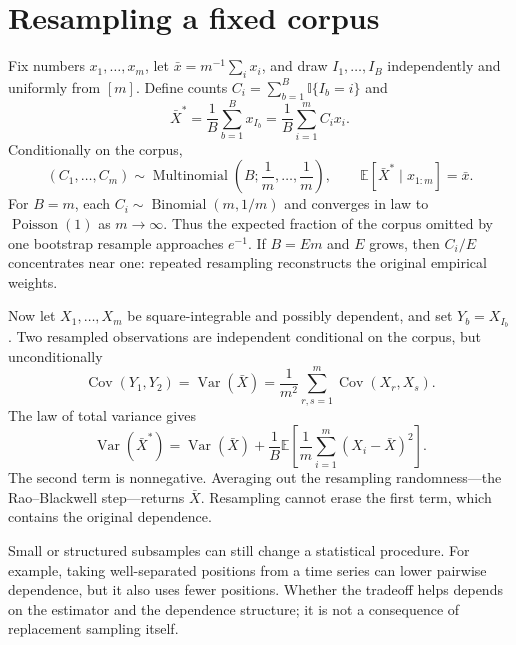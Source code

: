 \documentclass[11pt,twoside]{article}
\newcommand{\E}{\mathbb E}
\newcommand{\I}{\mathbb I}
\theoremstyle{definition}
\theoremstyle{remark}
\begin{document}
\exerciseinstructions
\setcounter{courseexercise}{0}








\appendix

\section{Resampling a fixed corpus}
\label{app:resampling}

Fix numbers \(x_1,\ldots,x_m\), let
\(\bar x=m^{-1}\sum_i x_i\), and draw \(I_1,\ldots,I_B\) independently and
uniformly from \([m]\). Define counts
\(C_i=\sum_{b=1}^B\I\{I_b=i\}\) and
\[
 \bar X^*=\frac1B\sum_{b=1}^B x_{I_b}
 =\frac1B\sum_{i=1}^m C_i x_i.
\]
Conditionally on the corpus,
\[
 (C_1,\ldots,C_m)\sim\operatorname{Multinomial}
 \left(B;\frac1m,\ldots,\frac1m\right),
 \qquad
 \E[\bar X^*\mid x_{1:m}]=\bar x.
\]
For \(B=m\), each \(C_i\sim\operatorname{Binomial}(m,1/m)\) and converges in
law to \(\operatorname{Poisson}(1)\) as \(m\to\infty\). Thus the expected
fraction of the corpus omitted by one bootstrap resample approaches
\(e^{-1}\). If
\(B=Em\) and \(E\) grows, then \(C_i/E\) concentrates near one: repeated
resampling reconstructs the original empirical weights.

Now let \(X_1,\ldots,X_m\) be square-integrable and possibly dependent, and set
\(Y_b=X_{I_b}\). Two resampled observations are independent conditional on
the corpus, but unconditionally
\begin{equation}
 \operatorname{Cov}(Y_1,Y_2)
 =\operatorname{Var}(\bar X)
 =\frac1{m^2}\sum_{r,s=1}^m\operatorname{Cov}(X_r,X_s).
 \label{eq:resampling-covariance}
\end{equation}
The law of total variance gives
\begin{equation}
 \operatorname{Var}(\bar X^*)
 =\operatorname{Var}(\bar X)
 +\frac1B\E\!\left[\frac1m\sum_{i=1}^m(X_i-\bar X)^2\right].
 \label{eq:resampling-variance}
\end{equation}
The second term is nonnegative. Averaging out the resampling randomness---the
Rao--Blackwell step---returns \(\bar X\). Resampling cannot erase the first
term, which contains the original dependence.

Small or structured subsamples can still change a statistical procedure. For
example, taking well-separated positions from a time series can lower pairwise
dependence, but it also uses fewer positions. Whether the tradeoff helps
depends on the estimator and the dependence structure; it is not a consequence
of replacement sampling itself.
\end{document}
